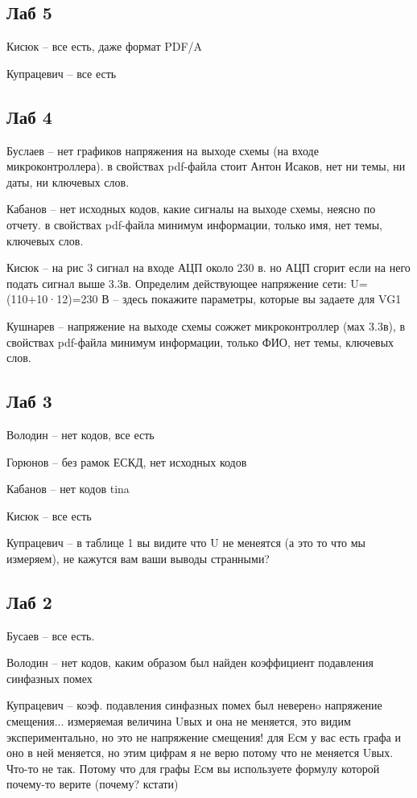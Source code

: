 \documentclass[a4paper,11pt]{article}
\begin{document}
\newpage
{}
\recalctypearea

\subsection*{Лаб 5}
Кисюк -- все есть, даже формат PDF/A

Купрацевич -- все есть
\subsection*{Лаб 4}

Буслаев -- нет графиков напряжения на выходе схемы (на входе микроконтроллера). в свойствах pdf-файла стоит Антон Исаков,
нет ни темы, ни даты, ни ключевых слов.

Кабанов -- нет исходных кодов, какие сигналы на выходе схемы, неясно по отчету.  в свойствах pdf-файла минимум информации,
только имя, нет темы, ключевых слов.

Кисюк -- на рис 3 сигнал на входе АЦП около 230 в. но АЦП сгорит если на него подать сигнал выше 3.3в.  Определим действующее напряжение сети:
U=(110+10·12)=230 В  -- здесь покажите параметры, которые вы задаете для VG1

Кушнарев -- напряжение на выходе схемы сожжет микроконтроллер (мах 3.3в), в свойствах pdf-файла минимум информации,
только ФИО, нет темы, ключевых слов.

\newpage
\subsection*{Лаб 3}

Володин -- нет кодов, все есть 

Горюнов -- без рамок ЕСКД, нет исходных кодов

Кабанов -- нет кодов tina

Кисюк -- все есть

Купрацевич -- в таблице 1 вы видите что U не менеятся (а это то что мы измеряем), не кажутся вам ваши выводы странными? 

\newpage
\subsection*{Лаб 2}

Бусаев -- все есть.

Володин -- нет кодов, каким образом был найден коэффициент подавления синфазных помех

Купрацевич -- коэф. подавления синфазных помех был неверенo
напряжение смещения...
измеряемая величина Uвых и она не меняется, это видим экспериментально,
но это не напряжение смещения! для Eсм у вас есть графа и оно в ней меняется, но этим цифрам я не верю потому что не меняется Uвых.
Что-то не так.
Потому что для графы Eсм вы используете формулу которой почему-то верите (почему? кстати)
\end{document}

